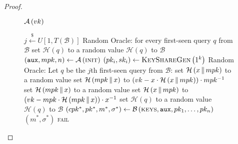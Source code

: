 \begin{proof}
      \begin{figure}[!htbp]
        \begin{algobox}{$\mathcal{A}\left(vk\right)$}
          \begin{algorithmic}[1]
            \State $j \overset{\$}{\gets} U\left[1,
            T\left(\mathcal{B}\right)\right]$
            \Indent
              \State Random Oracle: for every first-seen query $q$ from
              $\mathcal{B}$ set $\mathcal{H}\left(q\right)$ to a random value
              \State \Return $\mathcal{H}\left(q\right)$ to $\mathcal{B}$
            \EndIndent
            \State $\left(\mathtt{aux}, mpk, n\right) \gets
            \mathcal{A}\left(\textsc{init}\right)$
              \State $\left(pk_i, sk_i\right) \gets
              \textsc{KeyShareGen}\left(1^k\right)$
            \EndFor
            \Indent
              \State Random Oracle: Let $q$ be the $j$th first-seen query from
              $\mathcal{B}$:
                \State set $\mathcal{H}\left(x \,\|\, mpk\right)$ to a random
                value
                \State set $\mathcal{H}\left(mpk \,\|\, x\right)$ to $\left(vk
                - x \cdot \mathcal{H}\left(x \,\|\, mpk\right)\right) \cdot
                mpk^{-1}$
                \State set $\mathcal{H}\left(mpk \,\|\, x\right)$ to a random
                value
                \State set $\mathcal{H}\left(x \,\|\, mpk\right)$ to $\left(vk
                - mpk \cdot \mathcal{H}\left(mpk \,\|\, x\right)\right) \cdot
                x^{-1}$
              \Else
                \State set $\mathcal{H}\left(q\right)$ to a random value
              \EndIf
              \State \Return $\mathcal{H}\left(q\right)$ to $\mathcal{B}$
            \EndIndent
            \State $\left(cpk^*, pk^*, m^*, \sigma^*\right) \gets
            \mathcal{B}\left(\textsc{keys}, \mathtt{aux}, pk_1, \dots,
            pk_n\right)$
             
            \label{proof:comb:share:distinguisher:won}
              \State \Return $\left(m^*, \sigma^*\right)$
            \Else
              \State \Return \textsc{fail}
            \EndIf
          \end{algorithmic}
        \end{algobox}
        \caption{}
        \label{proof:comb:share:distinguisher}
      \end{figure}


\end{proof}
